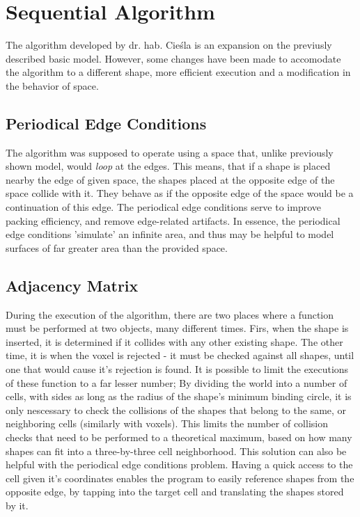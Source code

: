 \documentclass[12pt, oneside]{report}
\begin{document}
\section {Sequential Algorithm}

The algorithm developed by dr. hab. Cieśla is an expansion on the previusly described basic model. However, some changes have been made to accomodate the algorithm to a different shape, more efficient execution and a modification in the behavior of space.

\subsection{Periodical Edge Conditions}

The algorithm was supposed to operate using a space that, unlike previously shown model, would \textit{loop} at the edges. This means, that if a shape is placed nearby the edge of given space, the shapes placed at the opposite edge of the space collide with it. They behave as if the opposite edge of the space would be a continuation of this edge. The periodical edge conditions serve to improve packing efficiency, and remove edge-related artifacts. In essence, the periodical edge conditions 'simulate' an infinite area, and thus may be helpful to model surfaces of far greater area than the provided space.\autocite[1]{ciesla_mziff}

\subsection{Adjacency Matrix}

During the execution of the algorithm, there are two places where a function must be performed at two objects, many different times. Firs, when the shape is inserted, it is determined if it collides with any other existing shape. The other time, it is when the voxel is rejected - it must be checked against all shapes, until one that would cause it's rejection is found. It is possible to limit the executions of these function to a far lesser number; By dividing the world into a number of cells, with sides as long as the radius of the shape's minimum binding circle, it is only nescessary to check the collisions of the shapes that belong to the same, or neighboring cells (similarly with voxels). This limits the number of collision checks that need to be performed to a theoretical maximum, based on how many shapes can fit into a three-by-three cell neighborhood. \newline
This solution can also be helpful with the periodical edge conditions problem. Having a quick access to the cell given it's coordinates enables the program to easily reference shapes from the opposite edge, by tapping into the target cell and translating the shapes stored by it.
\end{document}
